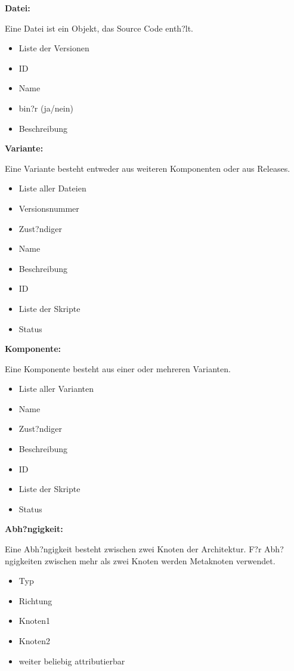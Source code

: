 \textbf{Datei:}\par
Eine Datei ist ein Objekt, das Source Code enth?lt.
\begin{itemize}
\item Liste der Versionen
\item ID
\item Name
\item bin?r (ja/nein)
\item Beschreibung\newline
\end{itemize}

\textbf{Variante:}\par
Eine Variante besteht entweder aus weiteren Komponenten oder aus Releases.
\begin{itemize}
\item Liste aller Dateien
\item Versionsnummer
\item Zust?ndiger
\item Name
\item Beschreibung
\item ID
\item Liste der Skripte
\item Status\newline
\end{itemize}

\textbf{Komponente:}\par
Eine Komponente besteht aus einer oder mehreren Varianten.
\begin{itemize}
\item Liste aller Varianten
\item Name
\item Zust?ndiger
\item Beschreibung
\item ID
\item Liste der Skripte
\item Status\newline
\end{itemize}

\textbf{Abh?ngigkeit:}\par
Eine Abh?ngigkeit besteht zwischen zwei Knoten der Architektur. F?r Abh?ngigkeiten zwischen mehr als zwei Knoten werden Metaknoten verwendet.
\begin{itemize}
\item Typ
\item Richtung
\item Knoten1
\item Knoten2
\item weiter beliebig attributierbar\newline
\end{itemize}

